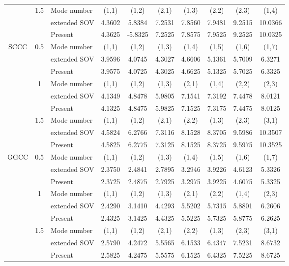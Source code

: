 \documentclass[preprint,12pt]{elsarticle}
\begin{document}
\begin{table}[!htbp]
\begin{tabular}{c c l c c c c c c c}
		& 1.5 & Mode number   & (1,1) & (1,2) & (2,1) & (1,3) & (2,2) & (2,3) & (1,4) \\
		&     & extended SOV \Citealp{xing2020extended}   & 4.3602 & 5.8384 & 7.2531 & 7.8560 & 7.9481 & 9.2515 & 10.0366 \\
		&     & Present       & 4.3625 & -5.8325 & 7.2525 & 7.8575 & 7.9525 & 9.2525 & 10.0325 \\
		SCCC & 0.5 & Mode number & (1,1) & (1,2) & (1,3) & (1,4) & (1,5) & (1,6) & (1,7) \\
		&     & extended SOV \Citealp{xing2020extended}   & 3.9596 & 4.0745 & 4.3027 & 4.6606 & 5.1361 & 5.7009 & 6.3271 \\
		&     & Present       & 3.9575 & 4.0725 & 4.3025 & 4.6625 & 5.1325 & 5.7025 & 6.3325 \\
		& 1   & Mode number  & (1,1) & (1,2) & (1,3) & (2,1) & (1,4) & (2,2) & (2,3) \\
		&     & extended SOV \Citealp{xing2020extended}   & 4.1349 & 4.8478 & 5.9805 & 7.1541 & 7.3192 & 7.4478 & 8.0121 \\
		&     & Present       & 4.1325 & 4.8475 & 5.9825 & 7.1525 & 7.3175 & 7.4475 & 8.0125 \\
		& 1.5 & Mode number  & (1,1) & (1,2) & (2,1) & (2,2) & (1,3) & (2,3) & (3,1) \\
		&     &extended SOV \Citealp{xing2020extended}  & 4.5824 & 6.2766 & 7.3116 & 8.1528 & 8.3705 & 9.5986 & 10.3507 \\
		&     & Present       & 4.5825 & 6.2775 & 7.3125 & 8.1525 & 8.3725 & 9.5975 & 10.3525 \\
		GGCC & 0.5 & Mode number  & (1,1) & (1,2) & (1,3) & (1,4) & (1,5) & (1,6) & (1,7) \\
		&     & extended SOV \Citealp{xing2020extended}   & 2.3750 & 2.4841 & 2.7895 & 3.2946 & 3.9226 & 4.6123 & 5.3326 \\
		&     & Present       & 2.3725 & 2.4875 & 2.7925 & 3.2975 & 3.9225 & 4.6075 & 5.3325 \\
		& 1   & Mode number  & (1,1) & (1,2) & (1,3) & (2,1) & (2,2) & (1,4) & (2,3) \\
		&     & extended SOV \Citealp{xing2020extended}   & 2.4290 & 3.1410 & 4.4293 & 5.5202 & 5.7315 & 5.8801 & 6.2606 \\
		&     & Present       & 2.4325 & 3.1425 & 4.4325 & 5.5225 & 5.7325 & 5.8775 & 6.2625 \\
		& 1.5 & Mode number  & (1,1) & (1,2) & (2,1) & (2,2) & (1,3) & (2,3) & (3,1) \\
		&     & extended SOV \Citealp{xing2020extended}   & 2.5790 & 4.2472 & 5.5565 & 6.1533 & 6.4347 & 7.5231 & 8.6732 \\
		&     & Present       & 2.5825 & 4.2475 & 5.5575 & 6.1525 & 6.4325 & 7.5225 & 8.6725 \\
		\bottomrule
	\end{tabular}
	\label{tab:sov2}
\end{table}
\end{document}
